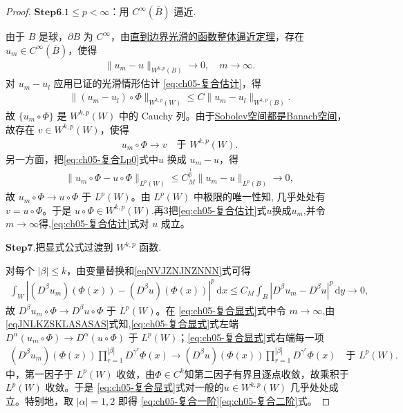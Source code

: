 \documentclass[../../main.tex]{subfiles}
\begin{document}
\begin{proof}
\noindent$\mathbf{Step}\bm{6}$.{\heiti $1\leqslant p<\infty$：用 $C^{\infty}(\overline{B})$ 逼近.}

由于 $B$ 是球，$\partial B$ 为 $C^{\infty}$，由\hyperref[theorem:ch05-直到边界光滑的函数整体逼近定理]{直到边界光滑的函数整体逼近定理}，存在 $u_m\in C^{\infty}(\overline{B})$，使得
\begin{align}\label{eqNVJZNJNZNNN}
\|u_m-u\|_{W^{k,p}(B)}\longrightarrow0,\quad m\to\infty.
\end{align}
对 $u_m-u_l$ 应用已证的光滑情形估计 \eqref{eq:ch05-复合估计}，得
\begin{align*}
\|(u_m-u_l)\circ\Phi\|_{W^{k,p}(W)}
\leqslant C\|u_m-u_l\|_{W^{k,p}(B)}.
\end{align*}
故 $\{u_m\circ\Phi\}$ 是 $W^{k,p}(W)$ 中的 Cauchy 列。由于\hyperref[theorem:ch05-WkpBanach]{Sobolev空间都是Banach空间}，故存在 $v\in W^{k,p}(W)$，使得
\begin{align}\label{eqJNLKZSKLASASAS}
u_m\circ\Phi\longrightarrow v\quad\text{于 }W^{k,p}(W).
\end{align}
另一方面，把\eqref{eq:ch05-复合Lp0}式中$u$ 换成 $u_m-u$，得
\begin{align*}
\|u_m\circ\Phi-u\circ\Phi\|_{L^{p}(W)}
\leqslant C_{M}^{\frac{1}{p}}\|u_m-u\|_{L^{p}(B)}\longrightarrow0,
\end{align*}
故 $u_m\circ\Phi\to u\circ\Phi$ 于 $L^{p}(W)$。由 $L^{p}(W)$ 中极限的唯一性知, 几乎处处有$v=u\circ\Phi$。于是 $u\circ\Phi\in W^{k,p}(W)$.再3把\eqref{eq:ch05-复合估计}式$u$换成$u_m$,并令$m\to \infty$得,\eqref{eq:ch05-复合估计}式对 $u$ 成立。

\noindent$\mathbf{Step}\bm{7}$.{\heiti 把显式公式过渡到 $W^{k,p}$ 函数.}

对每个 $|\beta|\leqslant k$，由变量替换和\eqref{eqNVJZNJNZNNN}式可得
\begin{align*}
\int_{W}|(D^{\beta}u_m)(\Phi(x))-(D^{\beta}u)(\Phi(x))|^{p}\,\mathrm{d}x
\leqslant C_{M}\int_{B}|D^{\beta}u_m-D^{\beta}u|^{p}\,\mathrm{d}y\longrightarrow0,
\end{align*}
故 $D^{\beta}u_m\circ\Phi\to D^{\beta}u\circ\Phi$ 于 $L^{p}(W)$。在 \eqref{eq:ch05-复合显式}式中令 $m\to\infty$,由\eqref{eqJNLKZSKLASASAS}式知,\eqref{eq:ch05-复合显式}式左端 $D^{\alpha}(u_m\circ\Phi)\to D^{\alpha}(u\circ\Phi)$ 于 $L^{p}(W)$；\eqref{eq:ch05-复合显式}式右端每一项
\begin{align*}
(D^{\beta}u_m)(\Phi(x))\prod_{r=1}^{|\beta|}D^{\gamma^{r}}\Phi(x)\to (D^{\beta}u)(\Phi(x))\prod_{r=1}^{|\beta|}D^{\gamma^{r}}\Phi(x)\quad\text{于 }L^p(W).
\end{align*}
中，第一因子于 $L^{p}(W)$ 收敛，由$\Phi\in C^{k}$知第二因子有界且逐点收敛，故乘积于 $L^{p}(W)$ 收敛。于是 \eqref{eq:ch05-复合显式}式对一般的$u\in W^{k,p}(W)$ 几乎处处成立。特别地，取 $|\alpha|=1,2$ 即得 \eqref{eq:ch05-复合一阶}\eqref{eq:ch05-复合二阶}式。


\end{proof}
\end{document}
